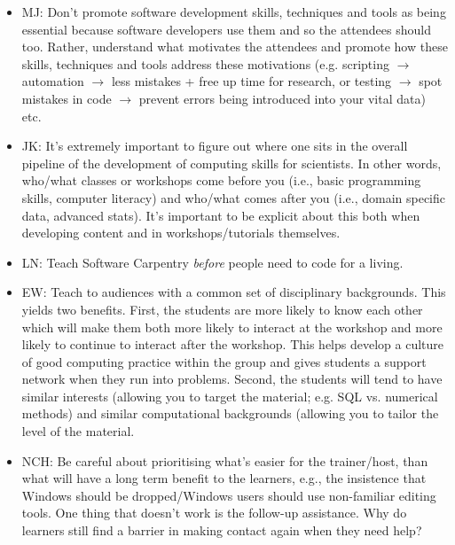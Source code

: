 \documentclass{article}
\begin{document}
\begin{itemize}
  \item MJ: Don't promote software development skills, techniques and
    tools as being essential because software developers use them and
    so the attendees should too. Rather, understand what motivates the
    attendees and promote how these skills, techniques and tools
    address these motivations (e.g. scripting $\rightarrow$ automation
    $\rightarrow$ less mistakes + free up time for research, or
    testing $\rightarrow$ spot mistakes in code $\rightarrow$ prevent
    errors being introduced into your vital data) etc.

  \item JK: It's extremely important to figure out where one sits in
    the overall pipeline of the development of computing skills for
    scientists. In other words, who/what classes or workshops come
    before you (i.e., basic programming skills, computer literacy) and
    who/what comes after you (i.e., domain specific data, advanced
    stats). It's important to be explicit about this both when
    developing content and in workshops/tutorials themselves.

  \item LN: Teach Software Carpentry \emph{before} people need to code
    for a living.

  \item EW: Teach to audiences with a common set of disciplinary
    backgrounds. This yields two benefits. First, the students are
    more likely to know each other which will make them both more
    likely to interact at the workshop and more likely to continue to
    interact after the workshop. This helps develop a culture of good
    computing practice within the group and gives students a support
    network when they run into problems. Second, the students will
    tend to have similar interests (allowing you to target the
    material; e.g. SQL vs. numerical methods) and similar
    computational backgrounds (allowing you to tailor the level of the
    material.

  \item NCH: Be careful about prioritising what's easier for the
    trainer/host, than what will have a long term benefit to the
    learners, e.g., the insistence that Windows should be
    dropped/Windows users should use non-familiar editing tools.  One
    thing that doesn't work is the follow-up assistance. Why do
    learners still find a barrier in making contact again when they
    need help?

\end{itemize}
\end{document}

